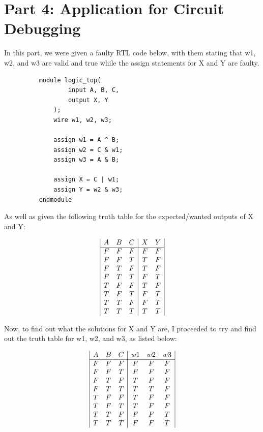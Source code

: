 \section{Part 4: Application for Circuit Debugging}
In this part, we were given a faulty RTL code below, with them stating that w1, w2, and w3 are valid and true while the assign statements for X and Y are faulty.
\begin{figure}[!htbp]
    \centering
    \begin{verbatim}
    module logic_top(
            input A, B, C,
            output X, Y
        );
        wire w1, w2, w3;

        assign w1 = A ^ B;
        assign w2 = C & w1;
        assign w3 = A & B;

        assign X = C | w1;
        assign Y = w2 & w3;
    endmodule
    \end{verbatim}
\end{figure}\newline
As well as given the following truth table for the expected/wanted outputs of X and Y:
\begin{center}
    \begin{displaymath}
    \begin{array}{|c c c|c c|}
      A & B & C & X & Y\\
    \hline
      F & F & F & F & F\\
      F & F & T & T & F\\
      F & T & F & T & F\\
      F & T & T & F & T\\
      T & F & F & T & F\\
      T & F & T & F & T\\
      T & T & F & F & T\\
      T & T & T & T & T\\
    \end{array}
    \end{displaymath}
\end{center}
Now, to find out what the solutions for X and Y are, I proceeded to try and find out the truth table for w1, w2, and w3, as listed below:
\begin{center}
    \begin{displaymath}
    \begin{array}{|c c c|c c c|}
      A & B & C & w1 & w2 & w3\\
    \hline
      F & F & F & F & F & F\\
      F & F & T & F & F & F\\
      F & T & F & T & F & F\\
      F & T & T & T & T & F\\
      T & F & F & T & F & F\\
      T & F & T & T & F & F\\
      T & T & F & F & F & T\\
      T & T & T & F & F & T\\
    \end{array}
    \end{displaymath}
\end{center}
